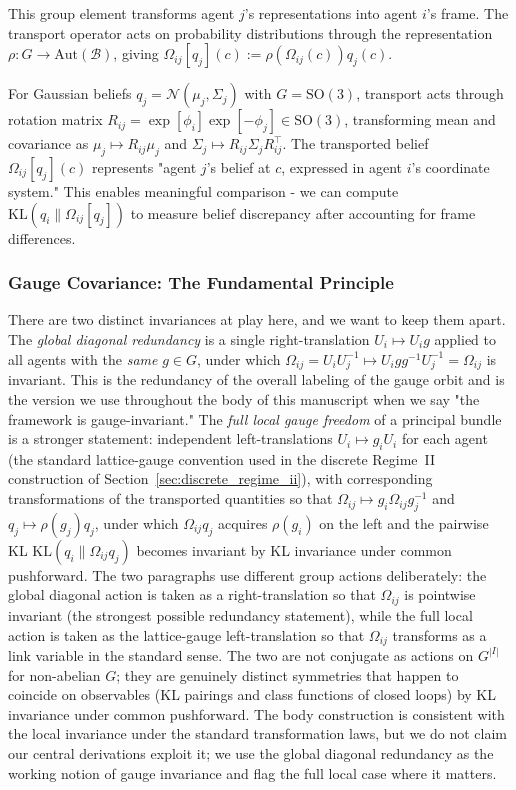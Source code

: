 \documentclass[11pt]{article}
\begin{document}
This group element transforms agent $j$'s representations into agent $i$'s frame. The transport operator acts on probability distributions through the representation $\rho: G \to \mathrm{Aut}(\mathcal{B})$, giving $\Omega_{ij}[q_j](c) := \rho(\Omega_{ij}(c))  q_j(c)$.

For Gaussian beliefs $q_j = \mathcal{N}(\mu_j, \Sigma_j)$ with $G = \mathrm{SO}(3)$, transport acts through rotation matrix $R_{ij} = \exp[\phi_i]\exp[ - \phi_j] \in \mathrm{SO}(3)$, transforming mean and covariance as $\mu_j \mapsto R_{ij} \mu_j$ and $\Sigma_j \mapsto R_{ij} \Sigma_j R_{ij}^\top$. The transported belief $\Omega_{ij}[q_j](c)$ represents "agent $j$'s belief at $c$, expressed in agent $i$'s coordinate system." This enables meaningful comparison - we can compute $\mathrm{KL}(q_i \| \Omega_{ij}[q_j])$ to measure belief discrepancy after accounting for frame differences.

\subsubsection{Gauge Covariance: The Fundamental Principle}

There are two distinct invariances at play here, and we want to keep them apart. The \emph{global diagonal redundancy} is a single right-translation $U_i \mapsto U_i g$ applied to all agents with the \emph{same} $g \in G$, under which $\Omega_{ij} = U_i U_j^{-1} \mapsto U_i g g^{-1} U_j^{-1} = \Omega_{ij}$ is invariant. This is the redundancy of the overall labeling of the gauge orbit and is the version we use throughout the body of this manuscript when we say "the framework is gauge-invariant." The \emph{full local gauge freedom} of a principal bundle is a stronger statement: independent left-translations $U_i \mapsto g_i U_i$ for each agent (the standard lattice-gauge convention used in the discrete Regime~II construction of Section~\ref{sec:discrete_regime_ii}), with corresponding transformations of the transported quantities so that $\Omega_{ij} \mapsto g_i \Omega_{ij} g_j^{-1}$ and $q_j \mapsto \rho(g_j) q_j$, under which $\Omega_{ij} q_j$ acquires $\rho(g_i)$ on the left and the pairwise KL $\mathrm{KL}(q_i \| \Omega_{ij} q_j)$ becomes invariant by KL invariance under common pushforward. The two paragraphs use different group actions deliberately: the global diagonal action is taken as a right-translation so that $\Omega_{ij}$ is pointwise invariant (the strongest possible redundancy statement), while the full local action is taken as the lattice-gauge left-translation so that $\Omega_{ij}$ transforms as a link variable in the standard sense. The two are not conjugate as actions on $G^{|I|}$ for non-abelian $G$; they are genuinely distinct symmetries that happen to coincide on observables (KL pairings and class functions of closed loops) by KL invariance under common pushforward. The body construction is consistent with the local invariance under the standard transformation laws, but we do not claim our central derivations exploit it; we use the global diagonal redundancy as the working notion of gauge invariance and flag the full local case where it matters.
\end{document}
